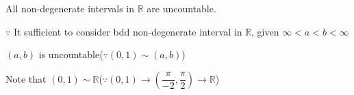 All non-degenerate intervals in $\mathbb R$ are uncountable.

$\because$ It sufficient to consider bdd non-degenerate interval in $\mathbb R$, given $\infty < a < b < \infty$

$(a,b)$ is uncountable($\because(0,1) \sim (a,b)$)

Note that $(0,1)\sim \mathbb R$($\because (0,1) \rightarrow (\dfrac{\pi}{-2},\dfrac{\pi}{2}) \rightarrow \mathbb R$)


